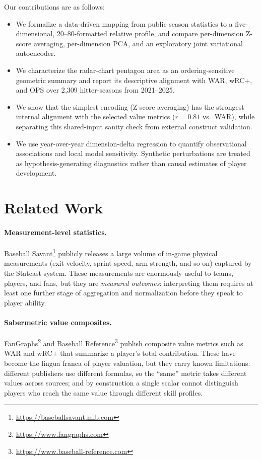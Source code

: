 \documentclass[10pt,twocolumn,letterpaper]{article}
\begin{document}
Our contributions are as follows:
\begin{itemize}
  \item We formalize a data-driven mapping from public season statistics to a five-dimensional, 20--80-formatted relative profile, and compare per-dimension Z-score averaging, per-dimension PCA, and an exploratory joint variational autoencoder.
  \item We characterize the radar-chart pentagon area as an ordering-sensitive geometric summary and report its descriptive alignment with WAR, wRC+, and OPS over 2{,}309 hitter-seasons from 2021--2025.
  \item We show that the simplest encoding (Z-score averaging) has the strongest internal alignment with the selected value metrics ($r=0.81$ vs.\ WAR), while separating this shared-input sanity check from external construct validation.
  \item We use year-over-year dimension-delta regression to quantify observational associations and local model sensitivity. Synthetic perturbations are treated as hypothesis-generating diagnostics rather than causal estimates of player development.
\end{itemize}

\section{Related Work}
\label{sec:related}

\paragraph{Measurement-level statistics.}
Baseball Savant\footnote{\url{https://baseballsavant.mlb.com}} publicly releases a large volume of in-game physical measurements (exit velocity, sprint speed, arm strength, and so on) captured by the Statcast system. These measurements are enormously useful to teams, players, and fans, but they are \emph{measured outcomes}: interpreting them requires at least one further stage of aggregation and normalization before they speak to player ability.

\paragraph{Sabermetric value composites.}
FanGraphs\footnote{\url{https://www.fangraphs.com}} and Baseball Reference\footnote{\url{https://www.baseball-reference.com}} publish composite value metrics such as WAR and wRC+ that summarize a player's total contribution. These have become the lingua franca of player valuation, but they carry known limitations: different publishers use different formulas, so the ``same'' metric takes different values across sources; and by construction a single scalar cannot distinguish players who reach the same value through different skill profiles.
\end{document}
